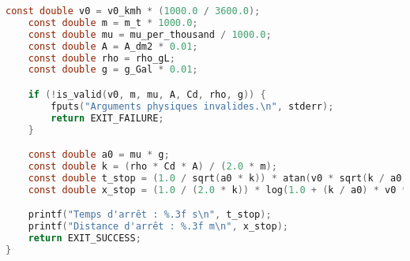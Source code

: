 \documentclass[french,a4paper,addpoints,11pt]{exam}
\begin{document}
\begin{questions}
\begin{solution}
\begin{lstlisting}[language=C]
    const double v0 = v0_kmh * (1000.0 / 3600.0);
    const double m = m_t * 1000.0;
    const double mu = mu_per_thousand / 1000.0;
    const double A = A_dm2 * 0.01;
    const double rho = rho_gL;
    const double g = g_Gal * 0.01;

    if (!is_valid(v0, m, mu, A, Cd, rho, g)) {
        fputs("Arguments physiques invalides.\n", stderr);
        return EXIT_FAILURE;
    }

    const double a0 = mu * g;
    const double k = (rho * Cd * A) / (2.0 * m);
    const double t_stop = (1.0 / sqrt(a0 * k)) * atan(v0 * sqrt(k / a0));
    const double x_stop = (1.0 / (2.0 * k)) * log(1.0 + (k / a0) * v0 * v0);

    printf("Temps d'arrêt : %.3f s\n", t_stop);
    printf("Distance d'arrêt : %.3f m\n", x_stop);
    return EXIT_SUCCESS;
}
\end{lstlisting}
        \end{solution}
    \end{questions}
\end{document}
